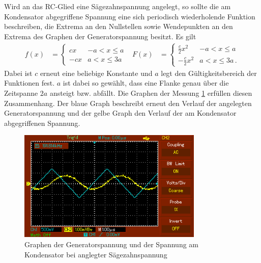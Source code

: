 Wird an das RC-Glied eine Sägezahnspannung angelegt, so sollte die am Kondensator
abgegriffene Spannung eine sich periodisch wiederholende Funktion beschreiben, die
Extrema an den Nullstellen sowie Wendepunkten an den Extrema des Graphen der
Generatorspannung besitzt. Es gilt
\begin{align}
  f(x)&=
  \begin{cases}
    c x & -a<x\leq a\\
    -c x & a<x\leq 3a
  \end{cases}
  & F(x)&=
  \begin{cases}
    \frac{c}{2} x^2 & -a<x\leq a\\
    -\frac{c}{2} x^2 & a<x\leq 3a   \,.
  \end{cases}
\end{align}
Dabei ist $c$ erneut eine beliebige Konstante und $a$ legt den Gültigkeitsbereich
der Funktionen fest. $a$ ist dabei so gewählt, dass eine Flanke genau über die Zeitspanne
$2a$ ansteigt bzw. abfällt.
Die Graphen der Messung \ref{fig:saegezahn} erfüllen diesen Zusammenhang.
Der blaue Graph beschreibt erneut den Verlauf der angelegten Generatorspannung und
der gelbe Graph den Verlauf der am Kondensator abgegriffenen Spannung.
\begin{figure}
  \centering
  \includegraphics[width=250pt]{data/integration_saegezahn.PNG}
  \caption{Graphen der Generatorspannung und der Spannung am Kondensator bei anglegter
  Sägezahnspannung}
  \label{fig:saegezahn}
\end{figure}


